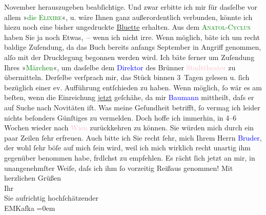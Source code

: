                   November herauszugeben beabſichtige. Und zwar erbitte ich mir für
               dasſelbe vor allem »\textcolor{green}{die \textsc{Elixire}}{}\ledrightnote{\textcolor{green}{Die drei Elixire}}«, u. wäre Ihnen ganz außerordentlich verbunden, könnte ich hiezu noch eine
               bisher ungedruckte \uline{Bluette} erhalten. Aus dem \textcolor{green}{\textsc{Anatol-Cyclus}}{}\ledrightnote{\textcolor{green}{Anatol}} haben Sie ja noch Etwas, – wenn ich nicht irre. Wenn möglich, bäte ich um recht
               baldige Zuſendung, da das Buch bereits anfangs September in Angriff genommen, alſo
               mit der Drucklegung begonnen werden wird.\pend
           \pstart
           Ich bäte ferner um Zuſendung Ihres »\textcolor{green}{Märchen}{}\ledrightnote{\textcolor{green}{Das Märchen. Schauspiel in drei Aufzügen}}«, um
               dasſelbe dem \textcolor{blue}{Direktor}{} des
               Brünner \textcolor{pink}{Stadttheater}{}\ledrightnote{\textcolor{pink}{Stadttheater}} zu übermit{\pb}teln. Derſelbe verſprach mir, das Stück binnen 3 Tagen
               gelesen u. ſich bezüglich einer ev. Aufführung entſchieden zu haben. Wenn möglich, ſo
               wär es am beſten, wenn die Einreichung \uline{jetzt}
               geſchähe, da mir \textcolor{blue}{Baumann}{}\ledrightnote{\textcolor{blue}{Adolf Baumann}} mittheilt, daſs er auf
               Suche \introOben{}nach Novitäten\introOben{} iſt.\pend
           \pstart
           Was meine Geſundheit betrifft, ſo vermag ich leider nichts beſonders Günſtiges zu
               vermelden. Doch hoffe ich immerhin, in 4–6 Wochen wieder nach \textcolor{pink}{Wien}{}\ledrightnote{\textcolor{pink}{Wien}} zurückkehren zu können.\pend
           \pstart
           Sie würden mich durch ein paar Zeilen ſehr erfreuen. Auch bitte ich Sie recht ſehr,
               mich Ihrem Herrn \textcolor{blue}{Bruder}{}, der
               wohl ſehr böſe auf mich ſein wird, weil ich mich wirklich recht unartig ihm gegenüber
               benommen habe, frdlchst zu empfehlen. Es rächt ſich jetzt an mir, in unangenehmſter
               Weiſe, daſs ich ihm ſo vorzeitig Reißaus genommen!\pend
           \pstart
           Mit herzlichen Grüßen{\\[\baselineskip]}Ihr{\\[\baselineskip]}Sie aufrichtig hochſchätzender{\\[\baselineskip]}\spacefill\mbox{EMKafka}\pend
           \leftskip=0em{}\pstart
